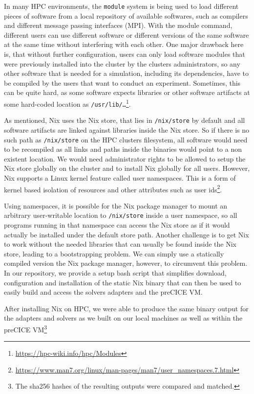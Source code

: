 \documentclass{eceasst}
\begin{document}
In many HPC environments, the \texttt{module} system is being used to load different pieces of software from a local repository of available softwares, such as compilers and different message passing interfaces (MPI).
With the module command, different users can use different software or different versions of the same software at the same time without interfering with each other.
One major drawback here is, that without further configuration, users can only load software modules that were previously installed into the cluster by the clusters administrators, so any other software that is needed for a simulation, including its dependencies, have to be compiled by the users that want to conduct an experiment.
Sometimes, this can be quite hard, as some software expects libraries or other software artifacts at some hard-coded location as \texttt{/usr/lib/\ldots}\footnote{\url{https://hpc-wiki.info/hpc/Modules}}.

As mentioned, Nix uses the Nix store, that lies in \texttt{/nix/store} by default and all software artifacts are linked against libraries inside the Nix store.
So if there is no such path as \texttt{/nix/store} on the HPC clusters filesystem, all software would need to be recompiled as all links and paths inside the binaries would point to a non existent location.
We would need administrator rights to be allowed to setup the Nix store globally on the cluster and to install Nix globally for all users.
However, Nix supports a Linux kernel feature called user namespaces.
This is a form of kernel based isolation of resources and other attributes such as user ids\footnote{\url{https://www.man7.org/linux/man-pages/man7/user_namespaces.7.html}}.

Using namespaces, it is possible for the Nix package manager to mount an arbitrary user-writable location to \texttt{/nix/store} inside a user namespace, so all programs running in that namespace can access the Nix store as if it would actually be installed under the default store path.
Another challenge is to get Nix to work without the needed libraries that can usually be found inside the Nix store, leading to a bootstrapping problem.
We can simply use a statically compiled version the Nix package manager, however, to circumvent this problem.
In our repository, we provide a setup bash script that simplifies download, configuration and installation of the static Nix binary that can then be used to easily build and access the solvers adapters and the preCICE VM.

After installing Nix on HPC, we were able to produce the same binary output for the adapters and solvers as we built on our local machines as well as within the preCICE VM\footnote{The sha256 hashes of the resulting outputs were compared and matched.}
\end{document}
